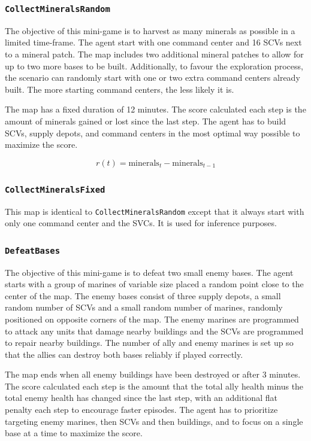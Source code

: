 \subsubsection*{\texttt{CollectMineralsRandom}}

The objective of this mini-game is to harvest as many minerals as possible in a limited time-frame. The agent start with one command center and 16 SCVs next to a mineral patch. The map includes two additional mineral patches to allow for up to two more bases to be built. Additionally, to favour the exploration process, the scenario can randomly start with one or two extra command centers already built. The more starting command centers, the less likely it is.

The map has a fixed duration of 12 minutes. The score calculated each step is the amount of minerals gained or lost since the last step. The agent has to build SCVs, supply depots, and command centers in the most optimal way possible to maximize the score.

$$
r(t) = \text{minerals}_{t} - \text{minerals}_{t-1}
$$

\subsubsection*{\texttt{CollectMineralsFixed}}

This map is identical to \texttt{CollectMineralsRandom} except that it always start with only one command center and the SVCs. It is used for inference purposes.

\subsubsection*{\texttt{DefeatBases}}

The objective of this mini-game is to defeat two small enemy bases. The agent starts with a group of marines of variable size placed a random point close to the center of the map. The enemy bases consist of three supply depots, a small random number of SCVs and a small random number of marines, randomly positioned on opposite corners of the map. The enemy marines are programmed to attack any units that damage nearby buildings and the SCVs are programmed to repair nearby buildings. The number of ally and enemy marines is set up so that the allies can destroy both bases reliably if played correctly.

The map ends when all enemy buildings have been destroyed or after 3 minutes. The score calculated each step is the amount that the total ally health minus the total enemy health has changed since the last step, with an additional flat penalty each step to encourage faster episodes. The agent has to prioritize targeting enemy marines, then SCVs and then buildings, and to focus on a single base at a time to maximize the score.

